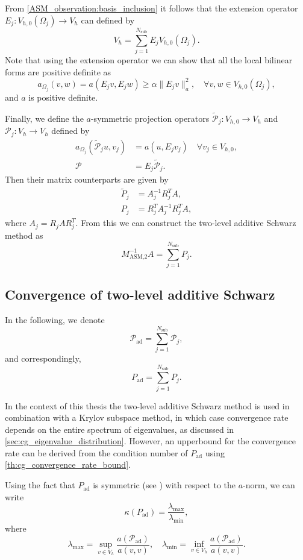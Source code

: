 From \cref{ASM_observation:basis_inclusion} it follows that the extension operator $E_j: V_{h,0}(\Omega_j) \rightarrow V_h$ can defined by
\[
  V_h = \sum_{j=1}^{N_{\text{sub}}} E_j V_{h,0}(\Omega_j).
\]
Note that using the extension operator we can show that all the local bilinear forms are positive definite as
\[
  a_{\Omega_j}(v,w) = a(E_j v, E_j w) \geq \alpha \| E_j v \|_a^2, \quad \forall v,w\in V_{h,0}(\Omega_j),
\]
and $a$ is positive definite.

Finally, we define the $a$-symmetric projection operators $\tilde{\mathcal{P}}_j: V_{h,0} \rightarrow V_h$ and $\mathcal{P}_j:V_h \rightarrow V_h$ defined by
\begin{align*}
  a_{\Omega_j}(\tilde{\mathcal{P}}_j u, v_j) & = a(u, E_j v_j) \quad \forall v_j \in V_{h,0}, \\
  \mathcal{P}                                & = E_j \tilde{\mathcal{P}}_j.
\end{align*}
Then their matrix counterparts are given by
\begin{align*}
  \tilde{P}_j & =  A_j^{-1} R_j^T A,      \\
  P_j         & = R_j^T A_j^{-1} R_j^T A,
\end{align*}
where $A_j = R_j A R_j^T$. From this we can construct the two-level additive Schwarz method as
\begin{equation}
  M_{\text{ASM,2}}^{-1} A = \sum_{j=1}^{N_{\text{sub}}} P_j.
  \label{eq:two_level_ASM_projections}
\end{equation}

\subsection{Convergence of two-level additive Schwarz}\label{sec:two_level_ASM_convergence}
In the following, we denote
\[
  \mathcal{P}_{\text{ad}} = \sum_{j=1}^{N_{\text{sub}}} \mathcal{P}_j,
\]
and correspondingly,
\[
  P_{\text{ad}} = \sum_{j=1}^{N_{\text{sub}}} P_j.
\]

In the context of this thesis the two-level additive Schwarz method is used in combination with a Krylov subspace method, in which case convergence rate depends on the entire spectrum of eigenvalues, as discussed in \cref{sec:cg_eigenvalue_distribution}. However, an upperbound for the convergence rate can be derived from the condition number of $P_{\text{ad}}$ using \cref{th:cg_convergence_rate_bound}.

Using the fact that $P_{\text{ad}}$ is symmetric (see \cite[Lemma 5.8]{schwarz_methods_Dolean_2015}) with respect to the $a$-norm, we can write
\[
  \kappa(P_{\text{ad}}) = \frac{\lambda_{\text{max}}}{\lambda_{\text{min}}},
\]
where
\[
  \lambda_{\text{max}} = \sup_{v\in V_h} \frac{a(\mathcal{P}_{\text{ad}})}{a(v,v)}, \quad \lambda_{\text{min}} = \inf_{v\in V_h} \frac{a(\mathcal{P}_{\text{ad}})}{a(v,v)}.
\]


